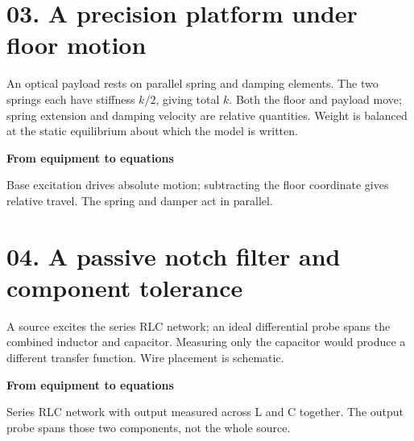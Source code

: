 \documentclass[10pt,a4paper]{article}
\begin{document}
\newpage
\section*{03. A precision platform under floor motion}
\begin{center}\resizebox{.88\linewidth}{!}{}\par{\small An optical payload rests on parallel spring and damping elements. The two springs each have stiffness $k/2$, giving total $k$. Both the floor and payload move; spring extension and damping velocity are relative quantities. Weight is balanced at the static equilibrium about which the model is written.}\end{center}
\medskip\textbf{From equipment to equations}\par
\begin{center}\resizebox{\ifdim\width>.98\linewidth.98\linewidth\else\width\fi}{!}{}\par{\small Base excitation drives absolute motion; subtracting the floor coordinate gives relative travel. The spring and damper act in parallel.}\end{center}

\newpage
\section*{04. A passive notch filter and component tolerance}
\begin{center}\resizebox{.88\linewidth}{!}{}\par{\small A source excites the series RLC network; an ideal differential probe spans the combined inductor and capacitor. Measuring only the capacitor would produce a different transfer function. Wire placement is schematic.}\end{center}
\medskip\textbf{From equipment to equations}\par
\begin{center}\resizebox{\ifdim\width>.98\linewidth.98\linewidth\else\width\fi}{!}{}\par{\small Series RLC network with output measured across L and C together. The output probe spans those two components, not the whole source.}\end{center}
\end{document}
